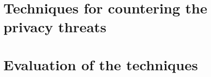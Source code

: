 \documentclass[english]{tktltiki2}
\theoremstyle{definition}
\theoremstyle{remark}
\begin{document}
\section{Techniques for countering the privacy threats}
\section{Evaluation of the techniques}




%
%
% 
%







% 
\end{document}
